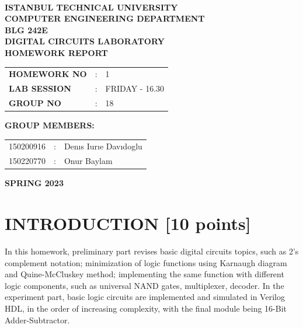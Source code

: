 \documentclass[pdftex,12pt,a4paper]{article}
\begin{document}
\begin{titlepage}
\begin{center}
\textbf{}\\
\textbf{\Large{ISTANBUL TECHNICAL UNIVERSITY}}\\
\vspace{0.5cm}
\textbf{\Large{COMPUTER ENGINEERING DEPARTMENT}}\\
\vspace{2cm}
\textbf{\Large{BLG 242E\\ DIGITAL CIRCUITS LABORATORY\\ HOMEWORK REPORT}}\\
\vspace{2.8cm}
\begin{table}[ht]
\centering
\Large{
\begin{tabular}{lcl}
\textbf{HOMEWORK NO}  & : & 1 \\
\textbf{LAB SESSION}  & : & FRIDAY - 16.30 \\
\textbf{GROUP NO}  & : & 18 \\
\end{tabular}}
\end{table}
\vspace{1cm}
\textbf{\Large{GROUP MEMBERS:}}\\
\begin{table}[ht]
\centering
\Large{
\begin{tabular}{rcl}
150200916  & : & Denıs Iurıe Davıdoglu \\
150220770  & : & Onur Baylam \\
\end{tabular}}
\end{table}
\vspace{2.8cm}
\textbf{\Large{SPRING 2023}}

\end{center}

\end{titlepage}

\thispagestyle{empty}
\setcounter{tocdepth}{4}
\tableofcontents
\clearpage

\setcounter{page}{1}

\section{INTRODUCTION [10 points]}

In this homework, preliminary part revises basic digital circuits topics, such as 2's complement notation; minimization of logic functions using 
Karnaugh diagram and Quine-McCluskey method; implementing the same function with different logic components, such as universal NAND gates, multiplexer, decoder. In the experiment part, basic logic circuits are implemented and simulated in Verilog HDL, in the order of increasing complexity, with the final module being 16-Bit Adder-Subtractor.
\end{document}
